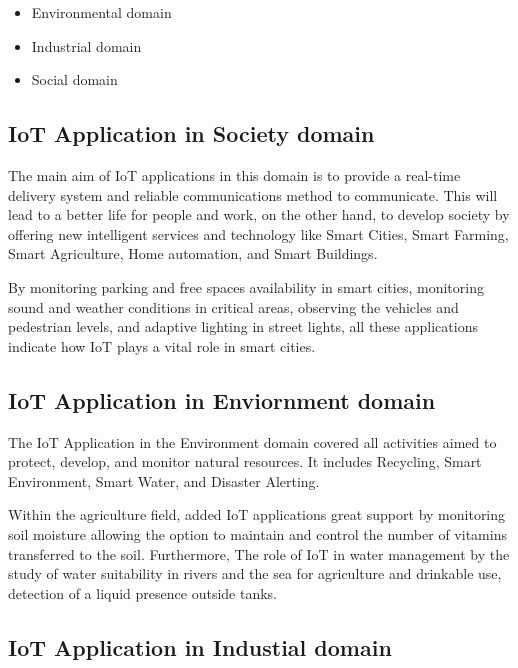 \documentclass[conference]{IEEEtran}
\begin{document}
\begin{itemize}
	\item Environmental domain
	\item Industrial domain
	\item Social domain
	
\end{itemize}



\subsection{IoT Application in Society domain }

The main aim of IoT applications in this domain is to provide a real-time delivery system and reliable communications method to communicate. This will lead to a better life for people and work, on the other hand, to develop society by offering new intelligent services and technology like  Smart Cities, Smart Farming, Smart Agriculture,  Home automation, and Smart Buildings.

By monitoring parking and free spaces availability in smart cities, monitoring sound and weather conditions in critical areas, observing the vehicles and pedestrian levels, and adaptive lighting in street lights, all these applications indicate how IoT plays a vital role in smart cities. 



\subsection{IoT Application in Enviornment domain}

The IoT Application in the Environment domain covered all activities aimed to protect, develop, and monitor natural resources. It includes  Recycling, Smart Environment, Smart Water, and Disaster Alerting. 

Within the agriculture field, added IoT applications great support by monitoring soil moisture allowing the option to maintain and control the number of vitamins transferred to the soil. Furthermore, The role of IoT in water management by the study of water suitability in rivers and the sea for agriculture and drinkable use, detection of a liquid presence outside tanks.

\subsection{IoT Application in Industial domain}
\end{document}
